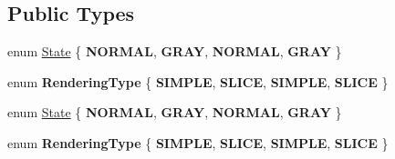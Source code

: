 \subsection*{Public Types}
\begin{DoxyCompactItemize}
\item 
enum \hyperlink{classui_1_1Scale9Sprite_a6580c2817c63b7a2461c48378b199d79}{State} \{ {\bfseries N\+O\+R\+M\+AL}, 
{\bfseries G\+R\+AY}, 
{\bfseries N\+O\+R\+M\+AL}, 
{\bfseries G\+R\+AY}
 \}
\item 
\mbox{\label{classui_1_1Scale9Sprite_a15260002722ace654cda4ed0a79e3602}} 
enum {\bfseries Rendering\+Type} \{ {\bfseries S\+I\+M\+P\+LE}, 
{\bfseries S\+L\+I\+CE}, 
{\bfseries S\+I\+M\+P\+LE}, 
{\bfseries S\+L\+I\+CE}
 \}
\item 
enum \hyperlink{classui_1_1Scale9Sprite_a6580c2817c63b7a2461c48378b199d79}{State} \{ {\bfseries N\+O\+R\+M\+AL}, 
{\bfseries G\+R\+AY}, 
{\bfseries N\+O\+R\+M\+AL}, 
{\bfseries G\+R\+AY}
 \}
\item 
\mbox{\label{classui_1_1Scale9Sprite_a15260002722ace654cda4ed0a79e3602}} 
enum {\bfseries Rendering\+Type} \{ {\bfseries S\+I\+M\+P\+LE}, 
{\bfseries S\+L\+I\+CE}, 
{\bfseries S\+I\+M\+P\+LE}, 
{\bfseries S\+L\+I\+CE}
 \}
\end{DoxyCompactItemize}
